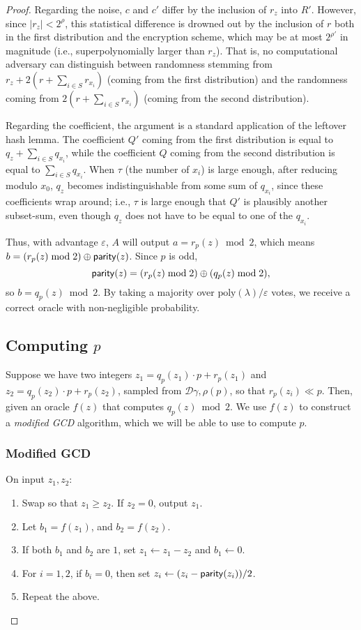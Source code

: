 \begin{proof}
Regarding the noise, $c$ and $c'$ differ by the inclusion of $r_z$ into $R'$. However, since $|r_z| < 2^\rho$, this statistical difference is drowned out by the inclusion of $r$ both in the first distribution and the encryption scheme, which may be at most $2^{\rho'}$ in magnitude (i.e., superpolynomially larger than $r_z$). That is, no computational adversary can distinguish between randomness stemming from $r_z + 2(r + \sum_{i \in S} r_{x_i})$ (coming from the first distribution) and the randomness coming from $2(r + \sum_{i \in S} r_{x_i})$ (coming from the second distribution).

Regarding the coefficient, the argument is a standard application of the leftover hash lemma. The coefficient $Q'$ coming from the first distribution is equal to $q_z + \sum_{i \in S} q_{x_i}$, while the coefficient $Q$ coming from the second distribution is equal to $\sum_{i \in S} q_{x_i}$. When $\tau$ (the number of $x_i$) is large enough, after reducing modulo $x_0$, $q_z$ becomes indistinguishable from some sum of $q_{x_i}$, since these coefficients wrap around; i.e., $\tau$ is large enough that $Q'$ is plausibly another subset-sum, even though $q_z$ does not have to be equal to one of the $q_{x_i}$.


Thus, with advantage $\varepsilon$, $A$ will output $a = r_p(z) \bmod 2$, which means $b = (r_p(z) \bmod 2) \oplus {\sf parity}(z)$. Since $p$ is odd,
\[{\sf parity}(z) = (r_p(z) \bmod 2) \oplus (q_p(z) \bmod 2),\]
so $b = q_p(z) \bmod 2$. By taking a majority over $\text{poly}(\lambda) / \varepsilon$ votes, we receive a correct oracle with non-negligible probability.



\subsection{Computing $p$}

Suppose we have two integers $z_1 = q_p(z_1) \cdot p + r_p(z_1)$ and  $z_2 = q_p(z_2) \cdot p + r_p(z_2)$, sampled from $\mathcal{D}{\gamma, \rho}(p)$, so that $r_p(z_i) \ll p$. Then, given an oracle $f(z)$ that computes $q_p(z) \bmod 2$. We use $f(z)$ to construct a \emph{modified GCD} algorithm, which we will be able to use to compute $p$.

\subsubsection{Modified GCD}

On input $z_1, z_2$:
\begin{enumerate}
\item Swap so that $z_1 \geq z_2$. If $z_2 = 0$, output $z_1$.
\item Let $b_1 = f(z_1)$, and $b_2 = f(z_2)$.
\item If both $b_1$ and $b_2$ are $1$, set $z_1
\leftarrow z_1 - z_2$ and $b_1 \leftarrow 0$.
\item For $i = 1, 2$, if $b_i = 0$, then set $z_i \leftarrow (z_i - {\sf parity}(z_i)) / 2$.
\item Repeat the above.
\end{enumerate}


\end{proof}
